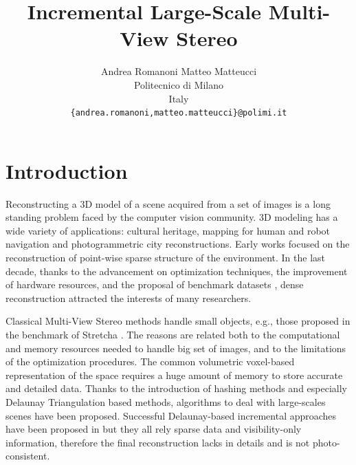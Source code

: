 \documentclass[times,10pt,twocolumn]{article}
\begin{document}
\title{Incremental Large-Scale Multi-View Stereo}
\author{Andrea Romanoni \qquad Matteo Matteucci\\
Politecnico di Milano\\
Italy\\
{\tt\small \{andrea.romanoni,matteo.matteucci\}@polimi.it}
}

\maketitle


\begin{abstract}
   
\end{abstract}

\section{Introduction}%
Reconstructing a 3D model of a scene acquired from a set of images is a long standing problem faced by the computer vision community. 
3D modeling has a wide variety of applications: cultural heritage, mapping for human and robot navigation and photogrammetric city reconstructions.
Early works focused on the reconstruction of point-wise sparse structure of the environment.
In the last decade, thanks to the advancement on optimization techniques,  the improvement of hardware resources, and the proposal of benchmark datasets \cite{seitz_et_al06,strecha2008},  dense reconstruction attracted the interests of many researchers.

Classical Multi-View Stereo methods \cite{gargallo2005bayesian,delaunoy_et_al_08} handle small objects, e.g., those proposed in the benchmark of Stretcha \etal \cite{strecha2006combined}.
The reasons are related both to the computational and memory resources needed to handle big set of images, and to the limitations of the optimization procedures.
The common volumetric voxel-based representation of the space requires a huge amount of memory to store accurate and detailed data.
Thanks to the introduction of hashing methods and especially  Delaunay Triangulation based methods, algorithms to deal with large-scales scenes have been proposed.
Successful Delaunay-based incremental approaches have been proposed in \cite{lovi_et_al_11,hoppe2013incremental,litvinov_lhuillier_13,romanoni15b,romanoni15a} but they all rely sparse data and visibility-only information, therefore the final reconstruction lacks in details and is not photo-consistent.
\end{document}
